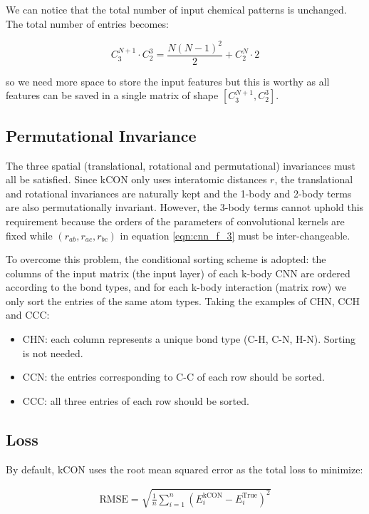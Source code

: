 \noindent We can notice that the total number of input chemical patterns is unchanged. The 
total number of entries becomes:

\begin{equation}
C^{N+1}_3 \cdot C^3_2 = \frac{N(N-1)^2}{2} + C^N_2 \cdot 2
\end{equation}

\noindent so we need more space to store the input features but this is worthy as all features 
can be saved in a single matrix of shape $[C^{N+1}_3, C^3_2]$.

\subsection{Permutational Invariance}

The three spatial (translational, rotational and permutational) invariances must all be 
satisfied. Since kCON only uses interatomic distances $r$, the translational and 
rotational invariances are naturally kept and the 1-body and 2-body terms are also 
permutationally invariant. However, the 3-body terms cannot uphold this
requirement because the orders of the parameters of convolutional kernels are fixed 
while $(r_{ab}, r_{ac}, r_{bc})$ in equation \ref{eqn:cnn_f_3} must be inter-changeable.

To overcome this problem, the conditional sorting scheme is adopted: the columns of the 
input matrix (the input layer) of each k-body CNN are ordered according to the bond types, 
and for each k-body interaction (matrix row) we only sort the  entries of the same atom 
types. Taking the examples of CHN, CCH and CCC:

\begin{itemize}
	\item CHN: each column represents a unique bond type (C-H, C-N, H-N). Sorting is not needed.
	\item CCN: the entries corresponding to C-C of each row should be sorted.
	\item CCC: all three entries of each row should be sorted.
\end{itemize}

\subsection{Loss}

By default, kCON uses the root mean squared error as the total loss to minimize:

\begin{eqnarray}
\mathrm{RMSE} = \sqrt{
	\frac{1}{n}
	\sum_{i=1}^{n}{ 
		\left( E_{i}^{\mathrm{kCON}} - E_{i}^{\mathrm{True}} \right)^2
	}
}	
\end{eqnarray}

